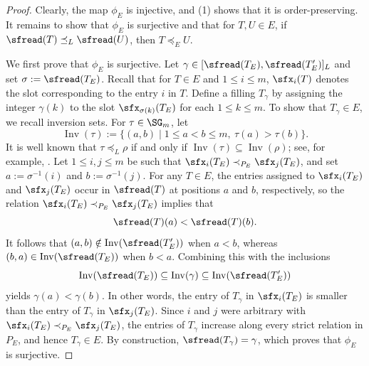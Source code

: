 \documentclass[12pt, reqno]{amsart}
\numberwithin{equation}{section}
\numberwithin{figure}{section}
\numberwithin{table}{section}
\theoremstyle{definition}
\begin{document}
\begin{proof}
Clearly, the map $\phi_E$ is injective, and (1) shows that it is order-preserving.
It remains to show that $\phi_E$ is surjective and that for $T,U \in E$, if $\sfread(T)\preceq_L\sfread(U)$, then $T\preceq_E U$.


We first prove that $\phi_E$ is surjective.
Let $\gamma \in [\sfread(T_E),\sfread(T'_E)]_L$ and set $\sigma:=\sfread(T_E)$.
Recall that for $T \in E$ and $1 \le i \le m$, $\sfx_i(T)$ denotes the slot corresponding to the entry $i$ in $T$.
Define a filling $T_\gamma$ by assigning the integer $\gamma(k)$ to the slot $\sfx_{\sigma(k)}(T_E)$ for each $1 \le k \le m$.
To show that $T_\gamma \in E$, we recall inversion sets.
For $\tau \in \SG_m$, let
\[
\operatorname{Inv}(\tau):=\{(a,b)\mid 1 \le a < b \le m,\ \tau(a) > \tau(b)\}.
\]
It is well known that $\tau\preceq_L\rho$ if and only if $\operatorname{Inv}(\tau)\subseteq\operatorname{Inv}(\rho)$; see, for example, \cite[Proposition~3.1.3]{BB05}.
Let $1 \le i, j \le m$ be such that $\sfx_i(T_E)\prec_{P_E}\sfx_j(T_E)$, and set $a:=\sigma^{-1}(i)$ and $b:=\sigma^{-1}(j)$.
For any $T \in E$, the entries assigned to $\sfx_i(T_E)$ and $\sfx_j(T_E)$ occur in $\sfread(T)$ at positions $a$ and $b$, respectively, so the relation $\sfx_i(T_E)\prec_{P_E}\sfx_j(T_E)$ implies that
\[
\sfread(T)(a)<\sfread(T)(b).
\]
It follows that $(a,b)\notin\operatorname{Inv}(\sfread(T'_E))$ when $a<b$, whereas $(b,a)\in\operatorname{Inv}(\sfread(T_E))$ when $b<a$.
Combining this with the inclusions
\[
\operatorname{Inv}(\sfread(T_E))
\subseteq \operatorname{Inv}(\gamma)
\subseteq \operatorname{Inv}(\sfread(T'_E))
\]
yields $\gamma(a)<\gamma(b)$.
In other words, the entry of $T_\gamma$ in $\sfx_i(T_E)$ is smaller than the entry of $T_\gamma$ in $\sfx_j(T_E)$.
Since $i$ and $j$ were arbitrary with $\sfx_i(T_E)\prec_{P_E}\sfx_j(T_E)$, the entries of $T_\gamma$ increase along every strict relation in $P_E$, and hence $T_\gamma \in E$.
By construction, $\sfread(T_\gamma)=\gamma$, which proves that $\phi_E$ is surjective.



\end{proof}
\end{document}
